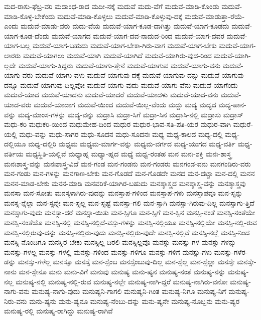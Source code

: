 {ಮದ-ರಾಸು-ಫೆಬ್ರ-ವರಿ
ಮದಾಂಧ-ರಾದ
ಮದೀ-ನಕ್ಕೆ
ಮದುವೆ
ಮದು-ವೆಗೆ
ಮದುವೆ-ಮಾಡಿ-ಕೊಂಡು
ಮದುವೆ-ಮಾಡಿ-ಕೊಳ್ಳ-ಬೇಕೆಂದು
ಮದುವೆ-ಮಾಡಿ-ಕೊಳ್ಳಲು
ಮದುವೆ-ಮಾಡಿ-ಕೊಳ್ಳುವು-ದಕ್ಕೆ
ಮದುವೆ-ಮಾಡುತ್ತಾ-ರೆಯೆ-ಎಂದು
ಮದುವೆ-ಮಾಡು-ವರು
ಮದು-ವೆಯ
ಮದುವೆ-ಯಾಗ-ಕೂಡ-ದಾಗಿತ್ತು
ಮದುವೆ-ಯಾಗ-ಕೂಡದು
ಮದುವೆ-ಯಾಗ-ಕೂಡ-ದೆಂದು
ಮದುವೆ-ಯಾಗದ
ಮದುವೆ-ಯಾಗ-ದವ-ನಾದುದ-ರಿಂದ
ಮದುವೆ-ಯಾಗ-ದವರ
ಮದುವೆ-ಯಾಗ-ಬಲ್ಲ
ಮದುವೆ-ಯಾಗ-ಬಹುದು
ಮದುವೆ-ಯಾಗ-ಬೇಕಾ-ಗಿರು-ವಾಗ
ಮದುವೆ-ಯಾಗ-ಬೇಕು
ಮದುವೆ-ಯಾಗ-ಲಾರರು
ಮದುವೆ-ಯಾಗಲು
ಮದುವೆ-ಯಾಗಿ
ಮದುವೆ-ಯಾಗಿದೆ
ಮದುವೆ-ಯಾಗಿರು-ವುದ-ರಿಂದ
ಮದುವೆ-ಯಾಗಿ-ಲ್ಲದೇ
ಮದುವೆ-ಯಾಗು-ತ್ತಿದ್ದರು
ಮದುವೆ-ಯಾಗು-ತ್ತೇನೆ
ಮದುವೆ-ಯಾಗುವ
ಮದುವೆ-ಯಾಗು-ವನು
ಮದುವೆ-ಯಾಗು-ವರು
ಮದುವೆ-ಯಾಗು-ವಳು
ಮದುವೆ-ಯಾಗುವು-ದಕ್ಕೆ
ಮದುವೆ-ಯಾಗುವು-ದನ್ನು
ಮದುವೆ-ಯಾಗುವು-ದನ್ನೂ
ಮದುವೆ-ಯಾಗುವು-ದಿಲ್ಲವೋ
ಮದುವೆ-ಯಾಗು-ವುದು
ಮದುವೆ-ಯಾಗು-ವೆನು
ಮದುವೆ-ಯಾಗೆಂದು
ಮದುವೆ-ಯಾದ
ಮದುವೆ-ಯಾದನು
ಮದುವೆ-ಯಾದರೆ
ಮದುವೆ-ಯಾದಳು
ಮದುವೆ-ಯಾದ-ವನು
ಮದುವೆ-ಯಾದ-ವರು
ಮದುವೆ-ಯಾದಾಗ
ಮದುವೆ-ಯಿಂದ
ಮದುವೆ-ಯಿಲ್ಲ-ವೆಂದು
ಮದ್ದು
ಮದ್ಯ
ಮದ್ಯದ
ಮದ್ಯ-ಪಾನ-ವನ್ನು
ಮದ್ಯ-ಮಾಂಸ-ಗಳನ್ನು
ಮದ್ಯ-ವನ್ನು
ಮದ್ರಾಸಿ
ಮದ್ರಾ-ಸಿಗೆ
ಮದ್ರಾ-ಸಿನ
ಮದ್ರಾಸಿ-ನಲ್ಲಿ
ಮದ್ರಾಸು
ಮದ್ರಾಸ್
ಮಧು-ಕರಿ
ಮಧುಕರಿ-ಯಿಂದ
ಮಧುಮೇಹ-ದಿಂದ
ಮಧುರ
ಮಧುರ-ಭಾವ-ಸತಿ-ಪತಿ-ಯರ
ಮಧುರ-ವಾಗಿ
ಮಧುರೆ-ಯಲ್ಲಿ
ಮಧು-ವನ್ನು
ಮಧು-ಸಾಗರ
ಮಧು-ಸೂದನ
ಮಧು-ಸೂದನಃ
ಮಧ್ಯ
ಮಧ್ಯ-ಕಾಲದ
ಮಧ್ಯ-ದಲ್ಲಿ
ಮಧ್ಯ-ದಲ್ಲಿಯೂ
ಮಧ್ಯ-ದಲ್ಲಿರಿ
ಮಧ್ಯಮ
ಮಧ್ಯಮ-ಮಾರ್ಗ-ವನ್ನು
ಮಧ್ಯಮ-ವರ್ಗದ
ಮಧ್ಯ-ಯುಗದ
ಮಧ್ಯ-ವರ್ತಿ
ಮಧ್ಯ-ವರ್ತಿಯ
ಮಧ್ಯಸ್ಥಿತಿ-ಯಲ್ಲಿವೆ
ಮಧ್ಯಾಹ್ನ
ಮಧ್ಯಾ-ಹ್ನದ
ಮಧ್ಯೆ
ಮಧ್ವ-ರಂತಹ
ಮನ
ಮನಃ-ಶಕ್ತಿ
ಮನಃ-ಶಾಸ್ತ್ರ
ಮನಃಶಾಸ್ತ್ರ-ವನ್ನು
ಮನಃಶಾಸ್ತ್ರ-ವಿದೆ
ಮನ-ಗಂಡ
ಮನ-ಗಂಡನು
ಮನ-ಗಂಡರು
ಮನಗಂಡ-ವನು
ಮನಗಂಡಿರು-ವರು
ಮನ-ಗಂಡು
ಮನ-ಗಳನ್ನು
ಮನಗಾಣ-ಬೇಕು
ಮನ-ಗೊಡದೆ
ಮನ-ಗೊಡದೇ
ಮನದ
ಮನ-ದಟ್ಟಾ
ಮನ-ದಲ್ಲಿ
ಮನನ
ಮನನ-ಮಾಡ-ಬೇಕು
ಮನನ-ಮಾಡಿ
ಮನವರಿಕೆ-ಯಾಗಿರ-ಬಹುದು
ಮನಶ್ಶಾಸ್ತ್ರದ
ಮನಶ್ಶಾಸ್ತ್ರ-ವನ್ನು
ಮನಶ್ಶಾಸ್ತ್ರವು
ಮನಸಾ
ಮನ-ಸೋತು
ಮನಸ್ಕಳಾಗಿರು-ವುದನ್ನು
ಮನಸ್ತಾಪ-ಗಳಿಂದ
ಮನಸ್ತಾಪ-ಗಳು
ಮನಸ್ತಾಪವೂ
ಮನ-ಸ್ಸನ್ನು
ಮನಸ್ಸ-ನ್ನೆಲ್ಲಾ
ಮನ-ಸ್ಸನ್ನೇ
ಮನ-ಸ್ಸಲ್ಲ
ಮನ-ಸ್ಸಷ್ಟೆ
ಮನಸ್ಸಾ-ಗಲಿ
ಮನ-ಸ್ಸಾಗಿ
ಮನಸ್ಸಾ-ಗಿರುವು-ದಿಲ್ಲ
ಮನಸ್ಸಾಗು-ತ್ತಿದೆ
ಮನಸ್ಸಾಗು-ವುದು
ಮನಸ್ಸಾ-ದರೆ
ಮನಸ್ಸಾ-ಯಿತು
ಮನ-ಸ್ಸಿಗೂ
ಮನ-ಸ್ಸಿಗೆ
ಮನ-ಸ್ಸಿನ
ಮನಸ್ಸಿ-ನಂತೆ
ಮನಸ್ಸಿ-ನಂತೆಯೇ
ಮನಸ್ಸಿ-ನಂತೆಯೊ
ಮನಸ್ಸಿ-ನಲ್ಲಿ
ಮನಸ್ಸಿ-ನಲ್ಲಿದೆ-ವಸ್ತು-ಗಳನ್ನು
ಮನಸ್ಸಿ-ನಲ್ಲಿಯೂ
ಮನಸ್ಸಿ-ನಲ್ಲಿಯೇ
ಮನಸ್ಸಿ-ನಲ್ಲಿ-ರುವ
ಮನಸ್ಸಿ-ನಲ್ಲಿರುವು-ದನ್ನು
ಮನಸ್ಸಿ-ನಲ್ಲಿರು-ವುದು
ಮನಸ್ಸಿ-ನಲ್ಲಿರು-ವುದೇ
ಮನಸ್ಸಿ-ನಲ್ಲಿವೆ
ಮನಸ್ಸಿ-ನಲ್ಲೆ
ಮನಸ್ಸಿ-ನಿಂದ
ಮನಸ್ಸಿ-ನೊಂದಿಗೂ
ಮನಸ್ಸಿರ-ಬೇಕು
ಮನಸ್ಸಿಲ್ಲ-ದಿರಲಿ
ಮನಸ್ಸಿಲ್ಲವೊ
ಮನಸ್ಸು
ಮನಸ್ಸು-ಗಳ
ಮನಸ್ಸು-ಗಳನ್ನು
ಮನಸ್ಸು-ಗಳಲ್ಲ
ಮನಸ್ಸು-ಗಳಲ್ಲಿ
ಮನಸ್ಸು-ಗಳಿಂದ
ಮನಸ್ಸು-ಗಳಿಗೂ
ಮನಸ್ಸು-ಗಳಿಗೆ
ಮನಸ್ಸು-ಗಳು
ಮನಸ್ಸು-ಗಳೆರ-ಡನ್ನು
ಮನಸ್ಸು-ಗಳೆಲ್ಲ
ಮನಸ್ಸೂ
ಮನಸ್ಸೆ
ಮನ-ಸ್ಸೆಂಬ
ಮನಸ್ಸೆಂಬುವು-ದಿಲ್ಲ
ಮನ-ಸ್ಸೆಲ್ಲ
ಮನ-ಸ್ಸೆಲ್ಲಾ
ಮನಸ್ಸೇ
ಮನಸ್ಸೇ-ನಾನು
ಮನ-ಸ್ಸೇನೂ
ಮನು
ಮನು-ವಿಗೆ
ಮನುವು
ಮನುಷ್ಯ
ಮನು-ಷ್ಯನ
ಮನುಷ್ಯ-ನಂತೆ
ಮನುಷ್ಯ-ನನ್ನು
ಮನುಷ್ಯ-ನಲ್ಲ
ಮನುಷ್ಯ-ನಲ್ಲಿ
ಮನುಷ್ಯ-ನಲ್ಲಿ-ರುವ
ಮನುಷ್ಯ-ನಲ್ಲೇ
ಮನುಷ್ಯ-ನಾಗಿ-ದ್ದರೆ
ಮನುಷ್ಯ-ನಾಗಿರು-ವನೋ
ಮನುಷ್ಯ-ನಾಗು-ವನು
ಮನುಷ್ಯ-ನಾಗು-ವುದು
ಮನುಷ್ಯನಿ-ಗಾಗಲಿ
ಮನುಷ್ಯನಿ-ಗಿಂತ
ಮನುಷ್ಯ-ನಿಗೂ
ಮನುಷ್ಯ-ನಿಗೆ
ಮನುಷ್ಯ-ನಿರು-ವನು
ಮನು-ಷ್ಯನು
ಮನು-ಷ್ಯನೂ
ಮನುಷ್ಯ-ನೆಂಬು-ದನ್ನು
ಮನು-ಷ್ಯನೇ
ಮನುಷ್ಯ-ನೊಬ್ಬನು
ಮನು-ಷ್ಯರ
ಮನುಷ್ಯ-ರಲ್ಲಿ
ಮನುಷ್ಯ-ರಾಗಿದ್ದು
ಮನುಷ್ಯ-ರಾಗಿವೆ
}
